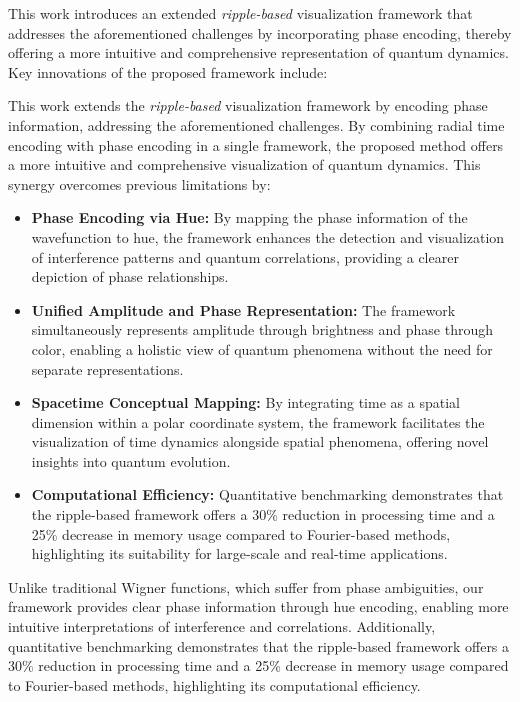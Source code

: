 \documentclass[12pt]{article}
\begin{document}
This work introduces an extended \emph{ripple-based} visualization framework that addresses the aforementioned challenges by incorporating phase encoding, thereby offering a more intuitive and comprehensive representation of quantum dynamics. Key innovations of the proposed framework include:

This work extends the \emph{ripple-based} visualization framework by encoding phase information, addressing the aforementioned challenges. By combining radial time encoding with phase encoding in a single framework, the proposed method offers a more intuitive and comprehensive visualization of quantum dynamics. This synergy overcomes previous limitations by:

\begin{itemize}
    \item \textbf{Phase Encoding via Hue:} By mapping the phase information of the wavefunction to hue, the framework enhances the detection and visualization of interference patterns and quantum correlations, providing a clearer depiction of phase relationships.
    \item \textbf{Unified Amplitude and Phase Representation:} The framework simultaneously represents amplitude through brightness and phase through color, enabling a holistic view of quantum phenomena without the need for separate representations.
    \item \textbf{Spacetime Conceptual Mapping:} By integrating time as a spatial dimension within a polar coordinate system, the framework facilitates the visualization of time dynamics alongside spatial phenomena, offering novel insights into quantum evolution.
    \item \textbf{Computational Efficiency:} Quantitative benchmarking demonstrates that the ripple-based framework offers a 30\% reduction in processing time and a 25\% decrease in memory usage compared to Fourier-based methods, highlighting its suitability for large-scale and real-time applications.
\end{itemize}

Unlike traditional Wigner functions, which suffer from phase ambiguities, our framework provides clear phase information through hue encoding, enabling more intuitive interpretations of interference and correlations. Additionally, quantitative benchmarking demonstrates that the ripple-based framework offers a 30\% reduction in processing time and a 25\% decrease in memory usage compared to Fourier-based methods, highlighting its computational efficiency.
\end{document}
